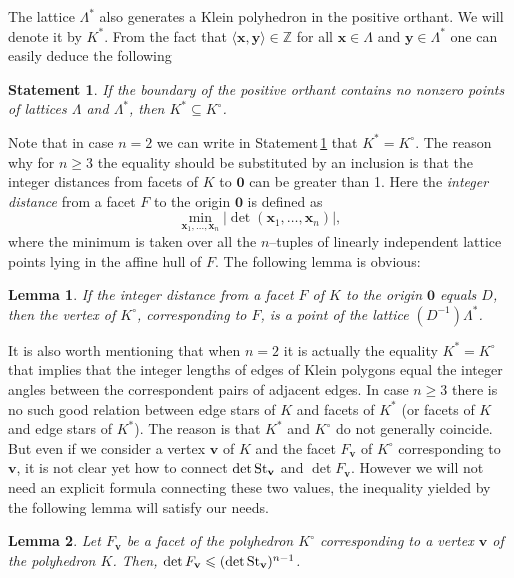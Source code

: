\documentclass[11pt]{article}
\theoremstyle{definition}
\theoremstyle{remark}
\theoremstyle{plain}
\newtheorem{lemma}{Lemma}
\newtheorem{statement}{Statement}
\renewcommand{\vec}[1]{\mathbf{#1}}
\renewcommand{\geq}{\geqslant}
\renewcommand{\leq}{\leqslant}
\newcommand{\starv}{\textup{St}_{\vec v}}
\newcommand{\La}{\Lambda}
\newcommand{\Z}{\mathbb{Z}}
\begin{document}
  The lattice $\La^\ast$ also generates a Klein polyhedron in the positive orthant. We will
  denote it by $K^\ast$. From the fact that $\langle\vec x,\vec y\rangle\in\Z$ for all
  $\vec x\in\La$ and $\vec y\in\La^\ast$ one can easily deduce the following

  \begin{statement} \label{st:Kast_is_a_subset_of_Kcirc}
    If the boundary of the positive orthant contains no nonzero points of lattices $\La$ and
    $\La^\ast$, then $K^\ast\subseteq K^\circ$.
  \end{statement}

  Note that in case $n=2$ we can write in Statement\,\ref{st:Kast_is_a_subset_of_Kcirc} that
  $K^\ast=K^\circ$. The reason why for $n\geq 3$ the equality should be substituted by an
  inclusion is that the integer distances from facets of $K$ to $\vec 0$ can be greater than
  1. Here the \emph{integer distance} from a facet $F$ to the origin $\vec 0$ is defined as
  \[ \min_{\vec x_1,\ldots,\vec x_n}|\det(\vec x_1,\ldots,\vec x_n)|, \]
  where the minimum is taken over all the $n$--tuples of linearly independent lattice points
  lying in the affine hull of $F$. The following lemma is obvious:
  \begin{lemma} \label{l:if_distance_is_D_then_the_dual_lattice_gets_divided_by_D}
    If the integer distance from a facet $F$ of $K$ to the origin $\vec 0$ equals $D$, then
    the vertex of $K^\circ$, corresponding to $F$, is a point of the lattice
    $(D^{-1})\La^\ast$.
  \end{lemma}

  It is also worth mentioning that when $n=2$ it is actually the equality $K^\ast=K^\circ$
  that implies that the integer lengths of edges of Klein polygons equal the integer angles
  between the correspondent pairs of adjacent edges. In case $n\geq 3$ there is no such good
  relation between edge stars of $K$ and facets of $K^\ast$ (or facets of $K$ and edge stars
  of $K^\ast$). The reason is that $K^\ast$ and $K^\circ$ do not generally coincide. But even
  if we consider a vertex $\vec v$ of $K$ and the facet $F_{\vec v}$ of $K^\circ$
  corresponding to $\vec v$, it is not clear yet how to connect $\det\starv$ and
  $\det F_{\vec v}$. However we will not need an explicit formula connecting these two
  values, the inequality yielded by the following lemma will satisfy our needs.

  \begin{lemma} \label{l:boundedness_of_detFv}
    Let $F_{\vec v}$ be a facet of the polyhedron $K^\circ$ corresponding to a vertex
    $\vec v$ of the polyhedron $K$. Then, $ \det F_{\vec v}\leq(\det\starv)^{n-1} $.
  \end{lemma}
\end{document}
